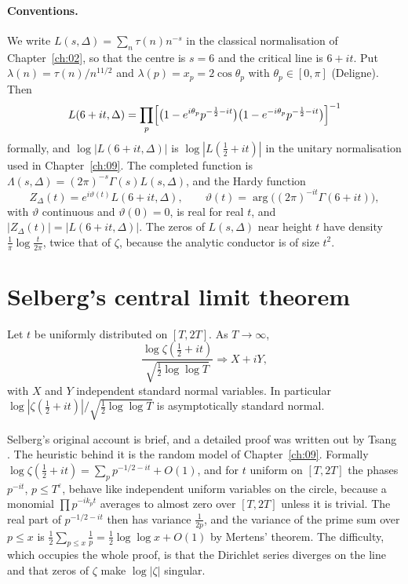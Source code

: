 \paragraph{Conventions.} We write $L(s,\Delta)=\sum_n\tau(n)n^{-s}$ in the classical normalisation of Chapter~\ref{ch:02}, so that the centre is $s=6$ and the critical line is $6+it$. Put $\lambda(n)=\tau(n)/n^{11/2}$ and $\lambda(p)=x_p=2\cos\theta_p$ with $\theta_p\in[0,\pi]$ (Deligne). Then
\[
L(6+it,\Delta)=\prod_p\Bigl[\bigl(1-e^{i\theta_p}p^{-\frac12-it}\bigr)\bigl(1-e^{-i\theta_p}p^{-\frac12-it}\bigr)\Bigr]^{-1}
\]
formally, and $\log|L(6+it,\Delta)|$ is $\log|L(\frac12+it)|$ in the unitary normalisation used in Chapter~\ref{ch:09}. The completed function is $\Lambda(s,\Delta)=(2\pi)^{-s}\Gamma(s)L(s,\Delta)$, and the Hardy function
\[
Z_\Delta(t)=e^{i\vartheta(t)}L(6+it,\Delta),\qquad\vartheta(t)=\arg\bigl((2\pi)^{-it}\Gamma(6+it)\bigr),
\]
with $\vartheta$ continuous and $\vartheta(0)=0$, is real for real $t$, and $|Z_\Delta(t)|=|L(6+it,\Delta)|$. The zeros of $L(s,\Delta)$ near height $t$ have density $\frac1\pi\log\frac{t}{2\pi}$, twice that of $\zeta$, because the analytic conductor is of size $t^2$.

\section{Selberg's central limit theorem}\label{sec:09bselberg}

\begin{theorem}\label{thm:09bselberg}
Let $t$ be uniformly distributed on $[T,2T]$. As $T\to\infty$,
\[
\frac{\log\zeta(\frac12+it)}{\sqrt{\frac12\log\log T}}\Longrightarrow X+iY,
\]
with $X$ and $Y$ independent standard normal variables. In particular $\log|\zeta(\frac12+it)|/\sqrt{\frac12\log\log T}$ is asymptotically standard normal.
\end{theorem}

Selberg's original account is brief, and a detailed proof was written out by Tsang \cite{tsang1984}. The heuristic behind it is the random model of Chapter~\ref{ch:09}. Formally $\log\zeta(\frac12+it)=\sum_p p^{-1/2-it}+O(1)$, and for $t$ uniform on $[T,2T]$ the phases $p^{-it}$, $p\le T^{\varepsilon}$, behave like independent uniform variables on the circle, because a monomial $\prod p^{-ik_pt}$ averages to almost zero over $[T,2T]$ unless it is trivial. The real part of $p^{-1/2-it}$ then has variance $\frac1{2p}$, and the variance of the prime sum over $p\le x$ is $\frac12\sum_{p\le x}\frac1p=\frac12\log\log x+O(1)$ by Mertens' theorem. The difficulty, which occupies the whole proof, is that the Dirichlet series diverges on the line and that zeros of $\zeta$ make $\log|\zeta|$ singular.

